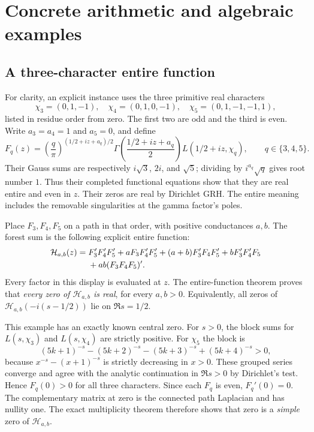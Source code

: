\section{Concrete arithmetic and algebraic examples}\label{sec:applications}

\subsection{A three-character entire function}

For clarity, an explicit instance uses the three primitive real characters
\[
 \chi_3=(0,1,-1),\quad
 \chi_4=(0,1,0,-1),\quad
 \chi_5=(0,1,-1,-1,1),
\]
listed in residue order from zero.  The first two are odd and the third is
even.  Write $a_3=a_4=1$ and $a_5=0$, and define
\[
 F_q(z)=
 \left(\frac q\pi\right)^{(1/2+iz+a_q)/2}
 \Gamma\!\left(\frac{1/2+iz+a_q}{2}\right)
 L(1/2+iz,\chi_q),\qquad q\in\{3,4,5\}.
\]
Their Gauss sums are respectively $i\sqrt3$, $2i$, and $\sqrt5$;
dividing by $i^{a_q}\sqrt q$ gives root number $1$.
Thus their completed functional equations show that they are
real entire and even in $z$.  Their zeros are real by Dirichlet GRH.
The entire meaning includes the removable singularities at the gamma
factor's poles.\cite{dlmfdirichlet}

Place $F_3,F_4,F_5$ on a path in that order, with positive conductances
$a,b$.  The forest sum is the following explicit entire function:
\begin{align}\label{eq:three-character}
 \mathcal H_{a,b}(z)={}&F_3'F_4'F_5'
  +aF_3F_4'F_5'+(a+b)F_3'F_4F_5'
  +bF_3'F_4'F_5 \notag\\
 &+ab(F_3F_4F_5)'.
\end{align}
Every factor in this display is evaluated at $z$.
The entire-function theorem proves that \emph{every zero of
$\mathcal H_{a,b}$ is real}, for every $a,b>0$.
Equivalently, all zeros of
$\mathcal H_{a,b}(-i(s-1/2))$ lie on $\Re s=1/2$.

This example has an exactly known central zero.  For $s>0$, the block sums
for $L(s,\chi_3)$ and $L(s,\chi_4)$ are strictly positive.  For $\chi_5$
the block is
\[
 (5k+1)^{-s}-(5k+2)^{-s}-(5k+3)^{-s}+(5k+4)^{-s}>0,
\]
because $x^{-s}-(x+1)^{-s}$ is strictly decreasing in $x>0$.
These grouped series converge and agree with the analytic continuation
in $\Re s>0$ by Dirichlet's test.  Hence $F_q(0)>0$ for all three
characters.  Since each $F_q$ is even, $F_q'(0)=0$.  The complementary
matrix at zero is the connected path Laplacian and has nullity one.
The exact multiplicity theorem therefore shows that zero is a
\emph{simple} zero of $\mathcal H_{a,b}$.

